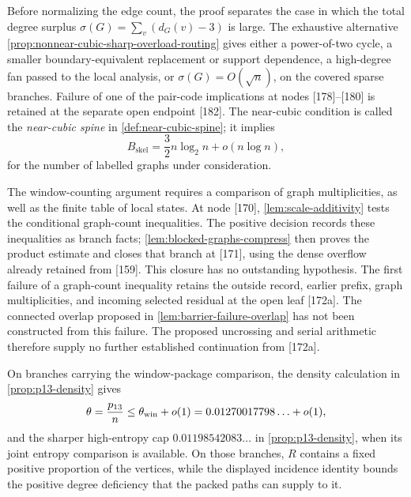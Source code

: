\documentclass[11pt]{article}
\begin{document}
Before normalizing the edge count, the proof separates the case in which the
total degree surplus
\(\sigma(G)=\sum_v(d_G(v)-3)\) is large.  The exhaustive alternative
\cref{prop:nonnear-cubic-sharp-overload-routing} gives either a power-of-two
cycle, a smaller boundary-equivalent replacement or support dependence, a
high-degree fan passed to the local analysis, or
\(\sigma(G)=O(\!\sqrt n)\), on the covered sparse branches.  Failure of
one of the pair-code implications at nodes [178]--[180] is retained at the
separate open endpoint [182].  The near-cubic condition is called the
\emph{near-cubic spine} in \cref{def:near-cubic-spine}; it implies
\[
B_{\mathrm{skel}}=\frac32 n\log_2 n+o(n\log n),
\]
for the number of labelled graphs under consideration.

The window-counting argument requires a comparison of graph multiplicities,
as well as the finite table of local states.  At node [170],
\cref{lem:scale-additivity} tests the conditional graph-count inequalities.
The positive decision records these inequalities as branch facts;
\cref{lem:blocked-graphs-compress} then proves the product estimate and
closes that branch at [171], using the dense overflow already retained
from [159].  This closure has no outstanding hypothesis.
The first failure of a graph-count inequality retains
the outside record, earlier prefix, graph multiplicities, and incoming
selected residual at the open leaf [172a].  The connected overlap proposed in
\cref{lem:barrier-failure-overlap} has not been constructed from this failure.
The proposed uncrossing and serial arithmetic therefore supply no further
established continuation from [172a].

On branches carrying the window-package comparison, the density calculation
in \cref{prop:p13-density} gives
\[
\theta=\frac{p_{13}}{n}\le \theta_{\rm win}+o(1)
=0.01270017798\ldots+o(1),
\]
and the sharper high-entropy cap $0.01198542083\ldots$ in
\cref{prop:p13-density}, when its joint entropy comparison is available.
On those branches, $R$ contains a fixed positive
proportion of the vertices, while the displayed incidence identity bounds the
positive degree deficiency that the packed paths can supply to it.
\end{document}
